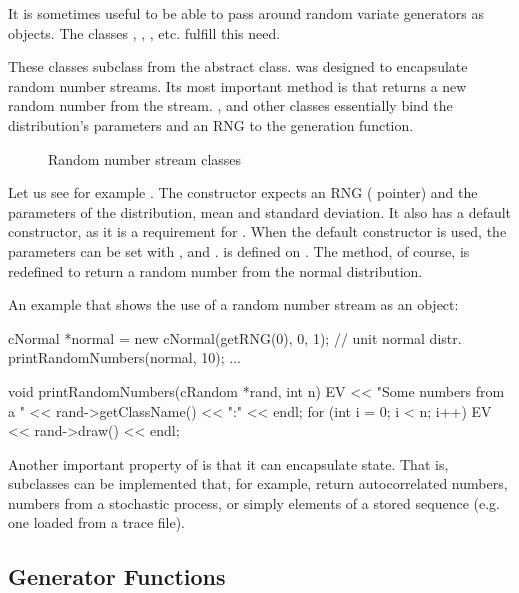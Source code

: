 It is sometimes useful to be able to pass around random variate generators
as objects. The classes , ,
, etc. fulfill this need.

These classes subclass from the  abstract class.
 was designed to encapsulate random number streams. Its
most important method is  that returns a new random number
from the stream. ,  and other classes
essentially bind the distribution's parameters and an RNG to the generation
function.

\begin{figure}[htbp]
  \begin{center}
    
    \caption{Random number stream classes}
  \end{center}
\end{figure}

Let us see for example . The constructor expects an RNG
( pointer) and the parameters of the distribution, mean and
standard deviation. It also has a default constructor, as it is a
requirement for . When the default constructor
is used, the parameters can be set with , 
and .  is defined on .
The  method, of course, is redefined to return a random
number from the normal distribution.

An example that shows the use of a random number stream as an object:

\begin{cpp}
cNormal *normal = new cNormal(getRNG(0), 0, 1); // unit normal distr.
printRandomNumbers(normal, 10);
...

void printRandomNumbers(cRandom *rand, int n)
{
    EV << "Some numbers from a " << rand->getClassName() << ":" << endl;
    for (int i = 0; i < n; i++)
        EV << rand->draw() << endl;
}
\end{cpp}

Another important property of  is that it can encapsulate
state. That is, subclasses can be implemented that, for example, return
autocorrelated numbers, numbers from a stochastic process, or simply
elements of a stored sequence (e.g. one loaded from a trace file).

\subsection{Generator Functions}
\label{sec:sim-lib:random-variate-generator-functions}

